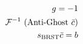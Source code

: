 \documentclass[preview]{standalone}
\begin{document}
\begin{align*}
\special{dvisvgm:raw <g id='unique000'>}g = -1\\\mathcal{F}^{-1}\text{ (Anti-Ghost }\bar{c})\\s_{\text{BRST}}\bar{c}=b\special{dvisvgm:raw </g>}
\end{align*}
\end{document}
